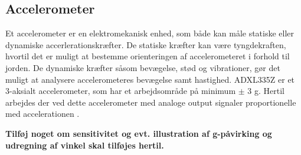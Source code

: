 \subsection{Accelerometer}
Et accelerometer er en elektromekanisk enhed, som både kan måle statiske eller dynamiske accerlerationskræfter. De statiske kræfter kan være tyngdekraften, hvortil det er muligt at bestemme orienteringen af accelerometeret i forhold til jorden. De dynamiske kræfter såsom bevægelse, stød og vibrationer, gør det muligt at analysere accelerometeres bevægelse samt hastighed. 
ADXL335Z er et 3-aksialt accelerometer, som har et arbejdsområde på minimum $\pm$ 3 g. Hertil arbejdes der ved dette accelerometer med analoge output signaler proportionelle med accelerationen \citep{analogdevices2010}. 

\textbf{Tilføj noget om sensitivitet og evt. illustration af g-påvirking og udregning af vinkel skal tilføjes hertil.}







